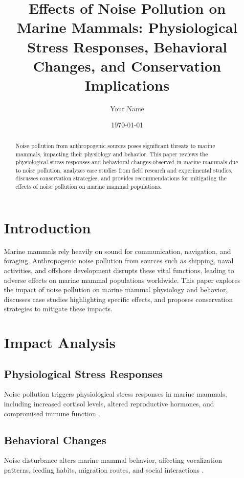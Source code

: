 \documentclass[12pt]{article}
\title{Effects of Noise Pollution on Marine Mammals: Physiological Stress Responses, Behavioral Changes, and Conservation Implications}
\author{Your Name}
\date{\today}
\begin{document}
\maketitle

\begin{abstract}
Noise pollution from anthropogenic sources poses significant threats to marine mammals, impacting their physiology and behavior. This paper reviews the physiological stress responses and behavioral changes observed in marine mammals due to noise pollution, analyzes case studies from field research and experimental studies, discusses conservation strategies, and provides recommendations for mitigating the effects of noise pollution on marine mammal populations.
\end{abstract}

\section{Introduction}
Marine mammals rely heavily on sound for communication, navigation, and foraging. Anthropogenic noise pollution from sources such as shipping, naval activities, and offshore development disrupts these vital functions, leading to adverse effects on marine mammal populations worldwide. This paper explores the impact of noise pollution on marine mammal physiology and behavior, discusses case studies highlighting specific effects, and proposes conservation strategies to mitigate these impacts.

\section{Impact Analysis}
\subsection{Physiological Stress Responses}
Noise pollution triggers physiological stress responses in marine mammals, including increased cortisol levels, altered reproductive hormones, and compromised immune function \citep{nowacek2007acoustic, rolland2012evidence}.

\subsection{Behavioral Changes}
Noise disturbance alters marine mammal behavior, affecting vocalization patterns, feeding habits, migration routes, and social interactions \citep{hatch2008evidence, wright2016marine}.
\end{document}

